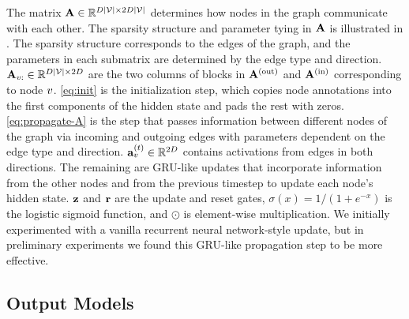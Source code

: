 \documentclass{article} %
\begin{document}
The matrix $\mathbf{A} \in \mathbb{R}^{D|\mathcal{V}| \times 2 D |\mathcal{V}|}$ determines
how nodes in the graph communicate with each other. The sparsity
structure and parameter tying in $\mathbf{A}$ is illustrated in
. The sparsity structure corresponds to the
edges of the graph, and the parameters in each
submatrix are determined by the edge type and direction.
$\mathbf{A}_{v:} \in \mathbb{R}^{D|\mathcal{V}| \times 2 D}$ are the two columns of blocks
in $\mathbf{A}^{(\mathrm{out})}$ and $\mathbf{A}^{(\mathrm{in})}$ corresponding to node $v$.
\eqref{eq:init} is the initialization step, which copies node annotations
into the first components of the hidden state and pads the rest with
zeros.  \eqref{eq:propagate-A} is the step that passes information
between different nodes of the graph via incoming and outgoing edges
with parameters dependent on the edge type and direction.
$\mathbf{a}_{v}^{(t)}\in\mathbb{R}^{2D}$ contains activations from edges in both
directions.
The remaining are GRU-like updates that incorporate information from the
other nodes and from the previous timestep to update each node's
hidden state.  $\mathbf{z}$ and $\mathbf{r}$ are the update and
reset gates, $\sigma(x)=1/(1+e^{-x})$ is the logistic sigmoid
function, and $\odot$ is element-wise multiplication. %
We initially experimented with
a vanilla recurrent neural network-style update, but in preliminary
experiments we found this GRU-like propagation step to be more
effective.


\subsection{Output Models}
\end{document}
